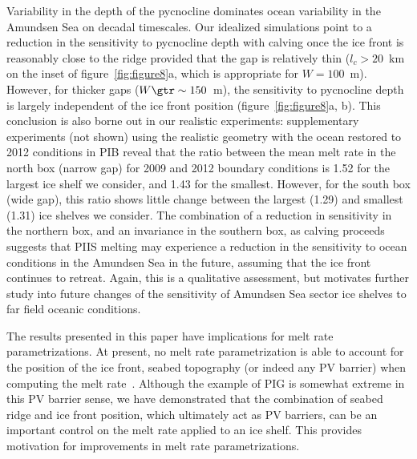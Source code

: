\documentclass[draft]{agujournal2019}
\begin{document}
Variability in the depth of the pycnocline dominates ocean variability in the Amundsen Sea on decadal timescales. Our idealized simulations point to a reduction in the sensitivity to pycnocline depth with calving once the ice front is reasonably close to the ridge provided that the gap is relatively thin ($l_c > 20$~km on the inset of figure~\ref{fig:figure8}a, which is appropriate for $W=100$~m). However, for thicker gaps ($W \gtr \sim 150$~m), the sensitivity to pycnocline depth is largely independent of the ice front position (figure~\ref{fig:figure8}a, b). This conclusion is also borne out in our realistic experiments: supplementary experiments (not shown) using the realistic geometry with the ocean restored to 2012 conditions in PIB reveal that the ratio between the mean melt rate in the north box (narrow gap) for 2009 and 2012 boundary conditions is 1.52 for the largest ice shelf we consider, and 1.43 for the smallest. However, for the south box (wide gap), this ratio shows little change between the largest (1.29) and smallest (1.31) ice shelves we consider. The combination of a reduction in sensitivity in the northern box, and an invariance in the southern box, as calving proceeds suggests that PIIS melting may experience a reduction in the sensitivity to ocean conditions in the Amundsen Sea in the future, assuming that the ice front continues to retreat. Again, this is a qualitative assessment, but motivates further study into future changes of the sensitivity of Amundsen Sea sector ice shelves to far field oceanic conditions.

The results presented in this paper have implications for melt rate parametrizations. At present, no melt rate parametrization is able to account for the position of the ice front, seabed topography (or indeed any PV barrier) when computing the melt rate~\cite{AsayDavis2017CurrClimChRep, Reese2018Cryo, Bradley2022}. Although the example of PIG is somewhat extreme in this PV barrier sense, we have demonstrated that the combination of seabed ridge and ice front position, which ultimately act as PV barriers, can be an important control on the melt rate applied to an ice shelf. This provides motivation for improvements in melt rate parametrizations. %
\end{document}
